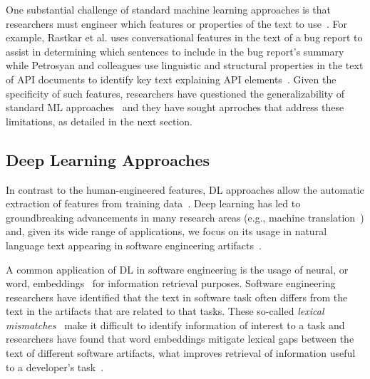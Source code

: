 One substantial challenge of standard machine learning
approaches is that researchers must engineer which 
features or properties of the text to use~\cite{ferreira2021}.
For example, Rastkar et al. uses conversational features in 
the text of a bug report to assist in determining which sentences 
to include in the bug report's summary~\cite{Rastkar2010}
while Petrosyan and colleagues use 
linguistic and structural properties 
in the text of API documents to identify key text 
explaining API elements~\cite{Petrosyan2015}.
Given the specificity of such features, 
researchers have questioned the generalizability
of standard \acs{ML} approaches~\cite{Xiao2018, fucci2019}
and they have sought aprroches that address these 
limitations, as detailed in the next section.






\subsection{Deep Learning Approaches}
\label{cp2:deep-learning}





In contrast to the human-engineered features,
\acf{DL} approaches allow the automatic extraction of features 
from training data~\cite{Deng2018, zhang2021deep}.
Deep learning has led to groundbreaking advancements in many 
research areas (e.g., machine translation~\cite{lopez2008translation}) 
and, given its wide range of applications, 
we focus
on its usage in natural language text appearing in software engineering artifacts~\cite{ferreira2021, li2018deep, watson2022}.






A common application of \acs{DL} in software engineering is the usage of neural, or word, embeddings~\cite{Mikolov2013}
for information retrieval purposes. 
Software engineering researchers have identified that the text 
in software task 
often differs from the text in the artifacts that are related to that tasks. 
These so-called \textit{lexical mismatches}~\cite{Ye2016, Huang2018} 
 make it difficult to identify information of interest 
to a task and researchers have found that word
embeddings mitigate lexical gaps between the text of different software artifacts,
what improves retrieval of information useful to a developer's task~\cite{Ye2016}. 


